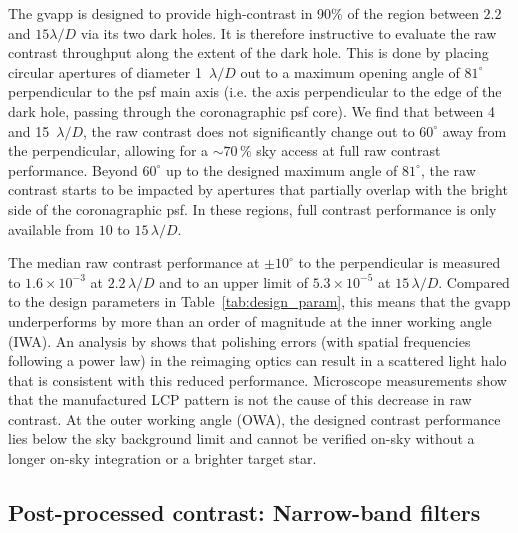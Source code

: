 \documentclass{aa}
\begin{document}
The \ac{gvapp} is designed to provide high-contrast in 90\% of the region between $2.2$ and $15\lambda/D$ via its two dark holes.
%
It is therefore instructive to evaluate the raw contrast throughput along the extent of the dark hole.
%
This is done by placing circular apertures of diameter 1~$\lambda/D$ out to a maximum opening angle of $81^\circ$ perpendicular to the \ac{psf} main axis (i.e. the axis perpendicular to the edge of the dark hole, passing through the coronagraphic \ac{psf} core).
%
We find that between 4 and 15~$\lambda/D$, the raw contrast does not significantly change out to $60^\circ$ away from the perpendicular, allowing for a $\sim 70 \, \%$ sky access at full raw contrast performance.
%
Beyond $60^\circ$ up to the designed maximum angle of $81^\circ$, the raw contrast starts to be impacted by apertures that partially overlap with the bright side of the coronagraphic \ac{psf}.
%
In these regions, full contrast performance is only available from $10$ to $15 \, \lambda/D$.

The median raw contrast performance at $\pm 10 ^\circ$ to the perpendicular is measured to $1.6 \times 10^{-3}$ at $2.2 \, \lambda/D$ and to an upper limit of $5.3 \times 10^{-5}$ at $15 \, \lambda/D$.
%
Compared to the design parameters in Table~\ref{tab:design_param}, this means that the \ac{gvapp} underperforms by more than an order of magnitude at the inner working angle (IWA).
%
An analysis by \citet{2021JATIS...7d5001B} shows that polishing errors (with spatial frequencies following a power law) in the reimaging optics can result in a scattered light halo that is consistent with this reduced performance.
%
Microscope measurements show that the manufactured LCP pattern is not the cause of this decrease in raw contrast.
%
At the outer working angle (OWA), the designed contrast performance lies below the sky background limit and cannot be verified on-sky without a longer on-sky integration or a brighter target star.

\subsection{Post-processed contrast: Narrow-band filters}
\end{document}
